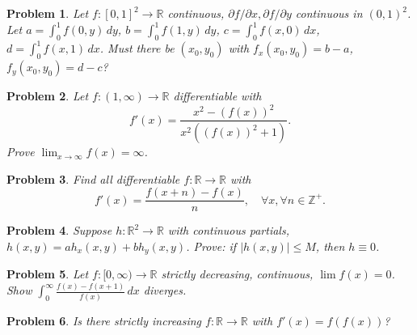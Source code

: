 \documentclass[12pt]{article}
\newtheorem{problem}{Problem}
\begin{document}
\begin{problem}
Let $f:[0,1]^2\to\mathbb{R}$ continuous, $\partial f/\partial x,\partial f/\partial y$ continuous in $(0,1)^2$. Let $a=\int_0^1 f(0,y)\,dy$, $b=\int_0^1 f(1,y)\,dy$, $c=\int_0^1 f(x,0)\,dx$, $d=\int_0^1 f(x,1)\,dx$. Must there be $(x_0,y_0)$ with $f_x(x_0,y_0)=b-a$, $f_y(x_0,y_0)=d-c$?
\end{problem}

\begin{problem}
Let $f:(1,\infty)\to\mathbb{R}$ differentiable with
\[
f'(x)=\frac{x^2-(f(x))^2}{x^2((f(x))^2+1)}.
\]
Prove $\lim_{x\to\infty} f(x)=\infty$.
\end{problem}

\begin{problem}
Find all differentiable $f:\mathbb{R}\to\mathbb{R}$ with
\[
f'(x)=\frac{f(x+n)-f(x)}{n},\quad \forall x, \forall n\in\mathbb{Z}^+.
\]
\end{problem}

\begin{problem}
Suppose $h:\mathbb{R}^2\to\mathbb{R}$ with continuous partials, $h(x,y)=a h_x(x,y)+b h_y(x,y)$. Prove: if $|h(x,y)|\leq M$, then $h\equiv0$.
\end{problem}

\begin{problem}
Let $f:[0,\infty)\to\mathbb{R}$ strictly decreasing, continuous, $\lim f(x)=0$. Show $\int_0^\infty \frac{f(x)-f(x+1)}{f(x)}\,dx$ diverges.
\end{problem}

\begin{problem}
Is there strictly increasing $f:\mathbb{R}\to\mathbb{R}$ with $f'(x)=f(f(x))$?
\end{problem}
\end{document}
